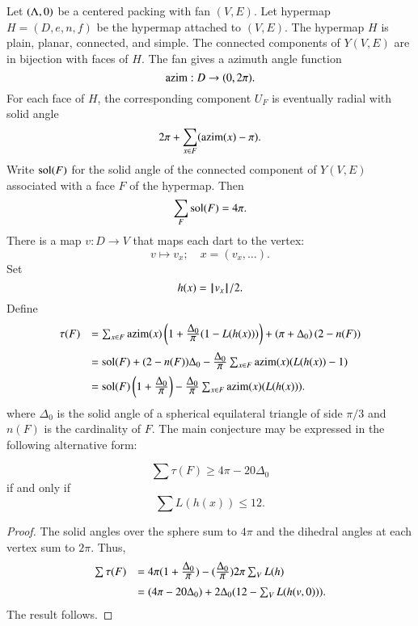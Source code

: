 Let $(\Lambda,0)$ be a centered packing with
fan $(V,E)$.  Let  hypermap $H=(D,e,n,f)$
be the hypermap attached to $(V,E)$.
The hypermap $H$ is plain, planar, connected, and simple.
The connected components of $Y(V,E)$ are in bijection with
faces of $H$.  
The fan gives a azimuth angle function
$$
{\operatorname{azim}} : D \to (0,2\pi).
$$
For each face of $H$, the corresponding component $U_F$
is eventually radial with solid
angle
  $$
  2\pi + \sum_{x\in F} ({\operatorname{azim}}(x) -\pi).
  $$
Write $\operatorname{sol}(F)$ for the solid angle of the connected component
of $Y(V,E)$ associated with a face $F$ of the hypermap.
Then
    $$\sum_{F} \operatorname{sol}(F) = 4\pi.$$
There is a map $v:D\to V$ that maps each dart to the vertex:
$$
v \mapsto v_x; \quad   x = (v_x,\ldots).
$$
Set 
$$h(x) = {{\hskip0.1em|\hskip-0.15em|\hskip0.1em}v_x{\hskip0.1em|\hskip-0.15em|\hskip0.1em}}/2.$$
Define
\begin{equation}
\begin{array}{lll}
\tau(F) &=\sum_{x\in F} \op{azim}(x)\left(1 + \dfrac{\Delta_0}{\pi}(1- L(h(x)))\right) + \left(\pi+{\Delta_0}\right) (2- n(F))\vspace{6pt}\\
  &= \sol(F) + (2- n(F))\Delta_0 - \dfrac{\Delta_0}{\pi}\sum_{x\in F}\op{azim}(x) (L(h(x)) - 1)\vspace{6pt}\\
&= \sol(F) \left( 1 + \dfrac{\Delta_0}{\pi}\right) - \dfrac{\Delta_0}{\pi} \sum_{x\in F} \op{azim}(x)(L(h(x))).\\
  
\end{array}
\end{equation}
where $\Delta_0$ is the solid angle of a spherical equilateral triangle of side $\pi/3$ and $n(F)$ is the cardinality of $F$.
% 
The main conjecture may be expressed in the following alternative form:

\begin{lemma}
$$
\sum \tau (F) \ge 4\pi - 20\Delta_0
$$
if and only if
$$
\sum L(h(x)) \le 12.
$$
\end{lemma}

\begin{proof}
The solid angles over the sphere sum to $4\pi$ and the dihedral angles at each vertex sum to $2\pi$. 
Thus,
\begin{equation}\label{eqn:delta0}
\begin{array}{lll}
\sum \tau (F) 
&= 4\pi (1 + \dfrac{\Delta_0}{\pi}) - (\dfrac{\Delta_0}{\pi}) 2\pi \sum_{V} L(h)\vspace{6pt}\\

&= (4\pi - 20\Delta_0) + 2\Delta_0 (12 - \sum_V L(h(v,\orz))).
\end{array}
\end{equation}
The result follows.
\end{proof}

